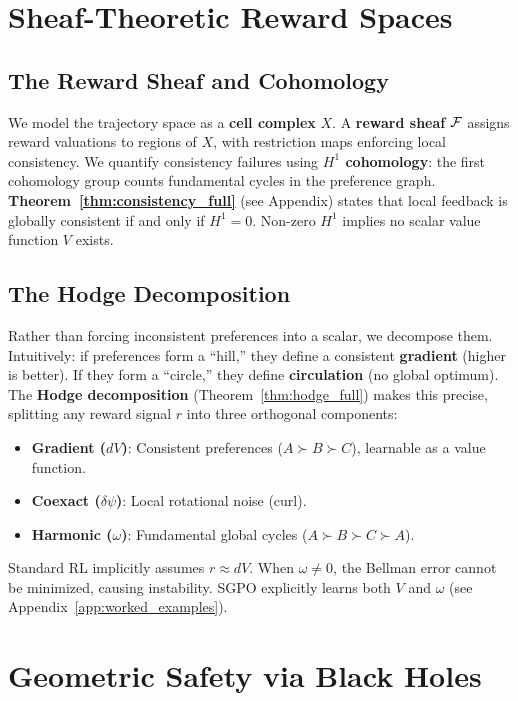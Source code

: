 \section{Sheaf-Theoretic Reward Spaces}
\label{sec:method}

\subsection{The Reward Sheaf and Cohomology}

We model the trajectory space as a \textbf{cell complex} $X$. A \textbf{reward sheaf} $\mathcal{F}$ assigns reward valuations to regions of $X$, with restriction maps enforcing local consistency. We quantify consistency failures using \textbf{$H^1$ cohomology}: the first cohomology group counts fundamental cycles in the preference graph. \textbf{Theorem~\ref{thm:consistency_full}} (see Appendix) states that local feedback is globally consistent if and only if $H^1 = 0$. Non-zero $H^1$ implies no scalar value function $V$ exists.

\subsection{The Hodge Decomposition}

Rather than forcing inconsistent preferences into a scalar, we decompose them. Intuitively: if preferences form a ``hill,'' they define a consistent \textbf{gradient} (higher is better). If they form a ``circle,'' they define \textbf{circulation} (no global optimum). The \textbf{Hodge decomposition} (Theorem~\ref{thm:hodge_full}) makes this precise, splitting any reward signal $r$ into three orthogonal components:
\begin{itemize}
\item \textbf{Gradient ($dV$)}: Consistent preferences ($A \succ B \succ C$), learnable as a value function.
\item \textbf{Coexact ($\delta \psi$)}: Local rotational noise (curl).
\item \textbf{Harmonic ($\omega$)}: Fundamental global cycles ($A \succ B \succ C \succ A$).
\end{itemize}
Standard RL implicitly assumes $r \approx dV$. When $\omega \neq 0$, the Bellman error cannot be minimized, causing instability. SGPO explicitly learns both $V$ and $\omega$ (see Appendix~\ref{app:worked_examples}).

\section{Geometric Safety via Black Holes}
\label{sec:safety}

